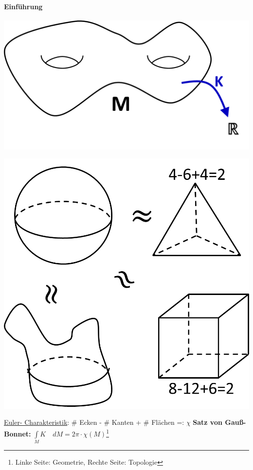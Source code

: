 \documentclass[a4paper,11pt,notitlepage]{report}
\theoremstyle{definition}
\begin{document}
\paragraph{Einführung}
\begin{center}
	 	\includegraphics[scale=0.5]{images/2012_01_10_Bild01.png}
	 \end{center}
\begin{center}
	 	\includegraphics[scale=0.5]{images/2012_01_10_Bild02.png}
	 \end{center}
\underline{Euler- Charakteristik}: \# Ecken - \# Kanten + \# Flächen =: $\chi$
\newline
\textbf{Satz von Gauß-Bonnet:}
$\boxed{\int\limits_M {K \quad d M} = 2 \pi \cdot \chi(M)}$\footnote{Linke Seite: Geometrie, Rechte Seite: Topologie}
\end{document}
